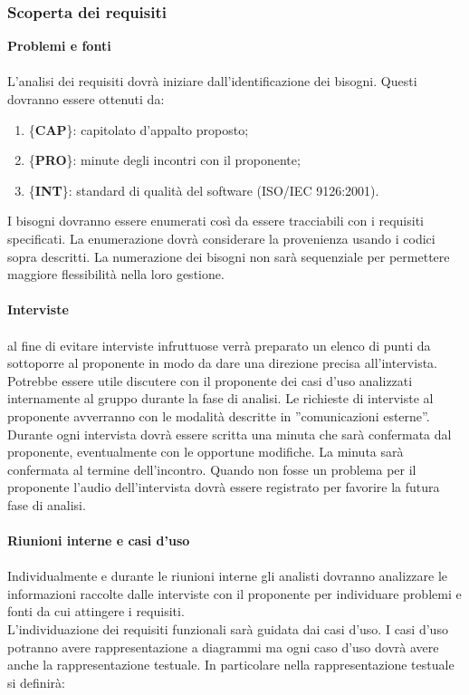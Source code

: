 {{		\subsubsection{Scoperta dei requisiti}{
			\textbf{Problemi e fonti}\\\\
			L’analisi dei requisiti dovr\`{a} iniziare dall’identificazione dei bisogni. Questi dovranno essere ottenuti da:
			\begin{enumerate}
				\item \{\textbf{CAP}\}: capitolato d'appalto proposto;
				\item \{\textbf{PRO}\}: minute degli incontri con il proponente;
				\item \{\textbf{INT}\}: standard di qualit\`{a} del software (ISO/IEC 9126:2001).
			\end{enumerate}
			I bisogni dovranno essere enumerati così da essere tracciabili con i requisiti specificati.
			La enumerazione dovr\`{a} considerare la provenienza usando i codici sopra descritti. La numerazione dei bisogni non sar\`{a} sequenziale per permettere maggiore flessibilit\`{a} nella loro gestione.\\\\
			\textbf{Interviste}\\\\
			al fine di evitare interviste infruttuose verr\`{a} preparato un elenco di punti da sottoporre al proponente in modo da dare una direzione precisa all’intervista. Potrebbe essere utile discutere con il proponente dei casi d'uso analizzati internamente al gruppo durante la fase di analisi.
			Le richieste di interviste al proponente avverranno con le modalit\`{a} descritte in ”comunicazioni esterne”. Durante ogni intervista dovr\`{a} essere scritta una minuta che sar\`{a} confermata dal proponente, eventualmente con le opportune modifiche. La minuta sar\`{a} confermata al termine dell’incontro. Quando non fosse un problema per il proponente l’audio dell’intervista dovr\`{a} essere registrato per favorire la futura fase di analisi.\\\\
			\textbf{Riunioni interne e casi d'uso}\\\\
			Individualmente e durante le riunioni interne gli analisti dovranno analizzare le informazioni raccolte dalle interviste con il proponente per individuare problemi e fonti da cui attingere i requisiti.\\
			L’individuazione dei requisiti funzionali sar\`{a} guidata dai casi d’uso. I casi d’uso potranno avere rappresentazione a diagrammi ma ogni caso d’uso dovr\`{a} avere anche la rappresentazione testuale. In particolare nella rappresentazione testuale si definir\`{a}:
}}}
